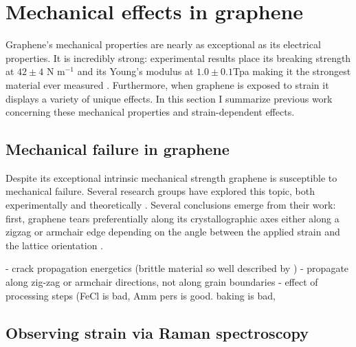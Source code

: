 \documentclass[edeposit,fullpage,draftthesis]{uiucthesis2009}
\begin{document}
        
        
    \section{Mechanical effects in graphene}
    
        Graphene's mechanical properties are nearly as exceptional as its electrical properties. It is incredibly
        strong: experimental results place its breaking strength at $42 \pm 4$ N m$^{-1}$ and its
        Young's modulus at $1.0 \pm 0.1 $Tpa making it the strongest material ever measured \cite{Lee2008}.
        Furthermore, when graphene is exposed to strain it displays a variety of unique effects. 
        In this section I summarize previous work concerning these mechanical properties and
        strain-dependent effects.
        
        \subsection{Mechanical failure in graphene}
        
        Despite its exceptional intrinsic mechanical strength graphene is susceptible to mechanical failure.
        Several research groups have explored this topic, both experimentally
        \cite{lee2013high, sen2010tearing,}
        and theoretically 
        \cite{zhao2010temperature, wang2012effect}.
        Several conclusions emerge from their work: first, graphene tears preferentially along its 
        crystallographic axes either along a zigzag or armchair edge depending
        on the angle between the applied strain and the lattice orientation \cite{kim2011ripping}. 
        
        - crack propagation energetics (brittle material so well described by \cite{griffith1921phenomena})
        - propagate along zig-zag or armchair directions, not along grain boundaries
        - effect of processing steps (FeCl is bad, Amm pers is good. baking is bad, 
        
        \subsection{Observing strain via Raman spectroscopy}
        \label{sec:bg:raman}
        
\end{document}
